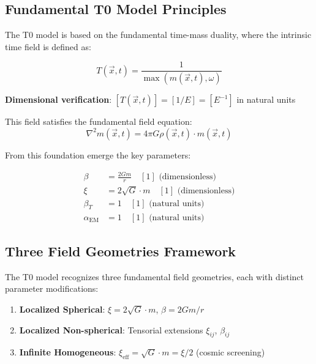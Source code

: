 \documentclass[12pt,a4paper]{article}
\newcommand{\Tfieldt}{T(\vec{x},t)}
\begin{document}
	\subsection{Fundamental T0 Model Principles}
	\label{subsec:t0_principles}
	
	The T0 model is based on the fundamental time-mass duality, where the intrinsic time field is defined as:
	
	\begin{equation}
		\Tfieldt = \frac{1}{\max(m(\vec{x},t), \omega)}
		\label{eq:time_field_fundamental}
	\end{equation}
	
	\textbf{Dimensional verification}: $[\Tfieldt] = [1/E] = [E^{-1}]$ in natural units \checkmark
	
	This field satisfies the fundamental field equation:
	\begin{equation}
		\nabla^2 m(\vec{x},t) = 4\pi G \rho(\vec{x},t) \cdot m(\vec{x},t)
		\label{eq:t0_field_equation}
	\end{equation}
	
	From this foundation emerge the key parameters:
	
	\begin{tcolorbox}[colback=blue!5!white,colframe=blue!75!black,title=T0 Model Parameters in Natural Units]
		\begin{align}
			\beta &= \frac{2Gm}{r} \quad [1] \text{ (dimensionless)} \\
			\xi &= 2\sqrt{G} \cdot m \quad [1] \text{ (dimensionless)} \\
			\beta_T &= 1 \quad [1] \text{ (natural units)} \\
			\alpha_{\text{EM}} &= 1 \quad [1] \text{ (natural units)}
		\end{align}
	\end{tcolorbox}
	
	\subsection{Three Field Geometries Framework}
	\label{subsec:three_geometries}
	
	The T0 model recognizes three fundamental field geometries, each with distinct parameter modifications:
	
	\begin{enumerate}
		\item \textbf{Localized Spherical}: $\xi = 2\sqrt{G} \cdot m$, $\beta = 2Gm/r$
		\item \textbf{Localized Non-spherical}: Tensorial extensions $\xi_{ij}$, $\beta_{ij}$
		\item \textbf{Infinite Homogeneous}: $\xi_{\text{eff}} = \sqrt{G} \cdot m = \xi/2$ (cosmic screening)
	\end{enumerate}
	
\end{document}
